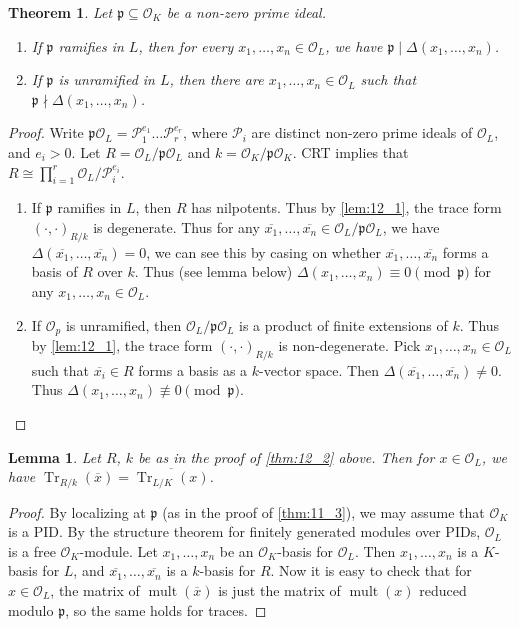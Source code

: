 \documentclass[11pt]{article}
\theoremstyle{definition}
\theoremstyle{plain}
\newtheorem{theorem}[definition]{Theorem}
\newtheorem*{lemma*}{Lemma}
\theoremstyle{remark}
\DeclareMathOperator{\Tr}{Tr}
\DeclareMathOperator{\mult}{mult}
\newcommand{\cO}{\mathcal{O}}
\newcommand{\cP}{\mathcal{P}}
\newcommand{\fp}{\mathfrak{p}}
\begin{document}
\begin{theorem}\label{thm:12_2}
    Let $\fp \subseteq \cO_K$ be a non-zero prime ideal.
    \begin{enumerate}
        \item If $\fp$ ramifies in $L$, then for every $x_1, \ldots, x_n \in \cO_L$, we have $\fp \mid \Delta(x_1, \ldots, x_n)$.
        \item If $\fp$ is unramified in $L$, then there are $x_1, \ldots, x_n \in \cO_L$ such that $\fp \nmid \Delta(x_1, \ldots, x_n)$.
    \end{enumerate}
\end{theorem}
\begin{proof}
    Write $\fp \cO_L = \cP_1^{e_1} \ldots \cP_r^{e_r}$, where $\cP_i$ are distinct non-zero prime ideals of $\cO_L$, and $e_i > 0$. Let $R = \cO_L / \fp \cO_L$ and $k = \cO_K / \fp \cO_K$. CRT implies that $R \cong \prod_{i=1}^r \cO_L / \cP_i^{e_i}$.
    \begin{enumerate}
        \item If $\fp$ ramifies in $L$, then $R$ has nilpotents. Thus by \autoref{lem:12_1}, the trace form $(\cdot, \cdot)_{R/k}$ is degenerate. Thus for any $\overline{x_1}, \ldots, \overline{x_n} \in \cO_L / \fp \cO_L$, we have $\Delta(\overline{x_1}, \ldots, \overline{x_n}) = 0$, we can see this by casing on whether $\overline{x_1}, \ldots, \overline{x_n}$ forms a basis of $R$ over $k$. Thus (see lemma below) $\Delta(x_1, \ldots, x_n) \equiv 0 \pmod{\fp}$ for any $x_1, \ldots, x_n \in \cO_L$.

        \item If $\cO_p$ is unramified, then $\cO_L / \fp \cO_L$ is a product of finite extensions of $k$. Thus by \autoref{lem:12_1}, the trace form $(\cdot, \cdot)_{R/k}$ is non-degenerate. Pick $x_1, \ldots, x_n \in \cO_L$ such that $\overline{x_i} \in R$ forms a basis as a $k$-vector space. Then $\Delta(\overline{x_1}, \ldots, \overline{x_n}) \neq 0$. Thus $\Delta(x_1, \ldots, x_n) \not\equiv 0 \pmod{\fp}$. \qedhere
    \end{enumerate}
\end{proof}

\begin{lemma*}
    Let $R$, $k$ be as in the proof of \autoref{thm:12_2} above. Then for $x \in \cO_L$, we have $\Tr_{R/k}(\overline{x}) = \overline{\Tr_{L/K}(x)}$.
\end{lemma*}
\begin{proof}
    By localizing at $\fp$ (as in the proof of \autoref{thm:11_3}), we may assume that $\cO_K$ is a PID. By the structure theorem for finitely generated modules over PIDs, $\cO_L$ is a free $\cO_K$-module. Let $x_1, \ldots, x_n$ be an $\cO_K$-basis for $\cO_L$. Then $x_1, \ldots, x_n$ is a $K$-basis for $L$, and $\overline{x_1}, \ldots, \overline{x_n}$ is a $k$-basis for $R$. Now it is easy to check that for $x \in \cO_L$, the matrix of $\mult(\overline{x})$ is just the matrix of $\mult(x)$ reduced modulo $\fp$, so the same holds for traces.
\end{proof}
\end{document}
